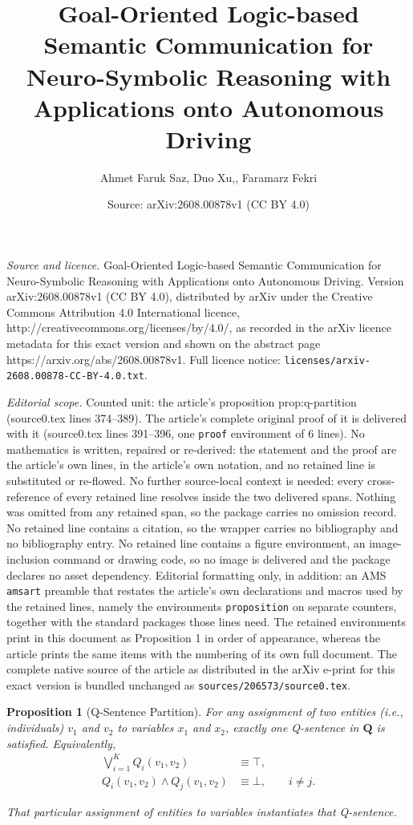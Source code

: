 \documentclass[10pt,a4paper]{amsart}
\title{Goal-Oriented Logic-based Semantic Communication for Neuro-Symbolic Reasoning with Applications onto Autonomous Driving}
\author{Ahmet Faruk Saz, Duo Xu,, Faramarz Fekri}
\date{Source: arXiv:2608.00878v1 (CC BY 4.0)}
\newtheorem{proposition}{Proposition}
\newcommand{\QSent}{\mathbf{Q}} %
\begin{document}
\maketitle

\noindent\emph{Source and licence.} Goal-Oriented Logic-based Semantic Communication for Neuro-Symbolic Reasoning with Applications onto Autonomous Driving. Version arXiv:2608.00878v1 (CC BY 4.0), distributed by arXiv under the Creative Commons Attribution 4.0 International licence, http://creativecommons.org/licenses/by/4.0/, as recorded in the arXiv licence metadata for this exact version and shown on the abstract page https://arxiv.org/abs/2608.00878v1. Full licence notice: \texttt{licenses/arxiv-2608.00878-CC-BY-4.0.txt}.\par\smallskip

\noindent\textit{Editorial scope.} Counted unit: the article's proposition prop:q-partition (source0.tex lines 374--389). The article's complete original proof of it is delivered with it (source0.tex lines 391--396, one \texttt{proof} environment of 6 lines). No mathematics is written, repaired or re-derived: the statement and the proof are the article's own lines, in the article's own notation, and no retained line is substituted or re-flowed.  No further source-local context is needed: every cross-reference of every retained line resolves inside the two delivered spans.  Nothing was omitted from any retained span, so the package carries no omission record.  No retained line contains a citation, so the wrapper carries no bibliography and no bibliography entry.  No retained line contains a figure environment, an image-inclusion command or drawing code, so no image is delivered and the package declares no asset dependency.  Editorial formatting only, in addition: an AMS \texttt{amsart} preamble that restates the article's own declarations and macros used by the retained lines, namely the environments \texttt{proposition} on separate counters, together with the standard packages those lines need.  The retained environments print in this document as Proposition 1 in order of appearance, whereas the article prints the same items with the numbering of its own full document.  The complete native source of the article as distributed in the arXiv e-print for this exact version is bundled unchanged as \texttt{sources/206573/source0.tex}.
\begin{proposition}[Q-Sentence Partition]
\label{prop:q-partition}
For any assignment of two entities (i.e., individuals) $v_1$ and $v_2$ to variables $x_1$ and $x_2$, exactly one Q-sentence in $\QSent$ is satisfied.
Equivalently,
\begin{align}
    \bigvee_{i=1}^{K}Q_i(v_1,v_2)
    &\equiv \top,
    \label{eq:q-exhaustive}\\
    Q_i(v_1,v_2)\land Q_j(v_1,v_2)
    &\equiv \bot,
    \qquad i\neq j.
    \label{eq:q-exclusive}
\end{align}

That particular assignment of entities to variables instantiates that Q-sentence.
\end{proposition}
\end{document}
